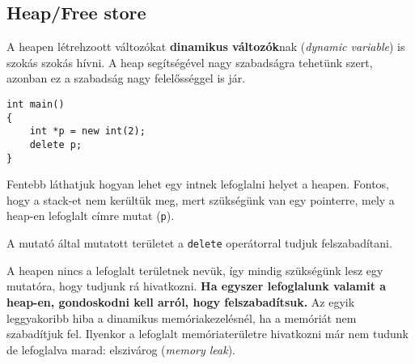 \documentclass[a4paper,11.5pt,table]{article}
\begin{document}
	\subsection{Heap/Free store}
	A heapen létrehzoott változókat \textbf{dinamikus változók}nak (\textit{dynamic variable}) is szokás szokás hívni. A heap segítségével nagy szabadságra tehetünk szert, azonban ez a szabadság nagy felelősséggel is jár.
	\begin{lstlisting}
int main()
{
	int *p = new int(2);
	delete p;
}
	\end{lstlisting}
	Fentebb láthatjuk hogyan lehet egy intnek lefoglalni helyet a heapen. Fontos, hogy a stack-et nem kerültük meg, mert szükségünk van egy pointerre, mely a heap-en lefoglalt címre mutat (\texttt{p}).
	
	A mutató által mutatott területet a \texttt{delete} operátorral tudjuk felszabadítani.
	\begin{figure}[!h]
		\centering
	\end{figure}
	
	A heapen nincs a lefoglalt területnek nevük, így mindig szükségünk lesz egy mutatóra, hogy tudjunk rá hivatkozni. \textbf{Ha egyszer lefoglalunk valamit a heap-en, gondoskodni kell arról, hogy felszabadítsuk.} Az egyik leggyakoribb hiba a dinamikus memóriakezelésnél, ha a memóriát nem szabadítjuk fel. Ilyenkor a lefoglalt memóriaterületre hivatkozni már nem tudunk de lefoglalva marad: elszivárog (\textit{memory leak}). 
	\smallskip
	
\end{document}
